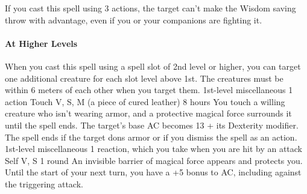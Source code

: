         If you cast this spell using 3 actions, the target can't make the Wisdom saving throw with advantage, even if you or your companions are fighting it.

        \paragraph{At Higher Levels}
        When you cast this spell using a spell slot of 2nd level or higher, you can target one additional creature for each slot level above 1st.
        The creatures must be within 6 meters of each other when you target them.
        {1st-level miscellaneous}
        {1 action}
        {Touch}
        {V, S, M (a piece of cured leather)}
        {8 hours}
        You touch a willing creature who isn't wearing armor, and a protective magical force surrounds it until the spell ends.
        The target's base AC becomes 13 + its Dexterity modifier.
        The spell ends if the target dons armor or if you dismiss the spell as an action.
        {1st-level miscellaneous}
        {1 reaction, which you take when you are hit by an attack}
        {Self}
        {V, S}
        {1 round}
        An invisible barrier of magical force appears and protects you.
        Until the start of your next turn, you have a +5 bonus to AC, including against the triggering attack.
